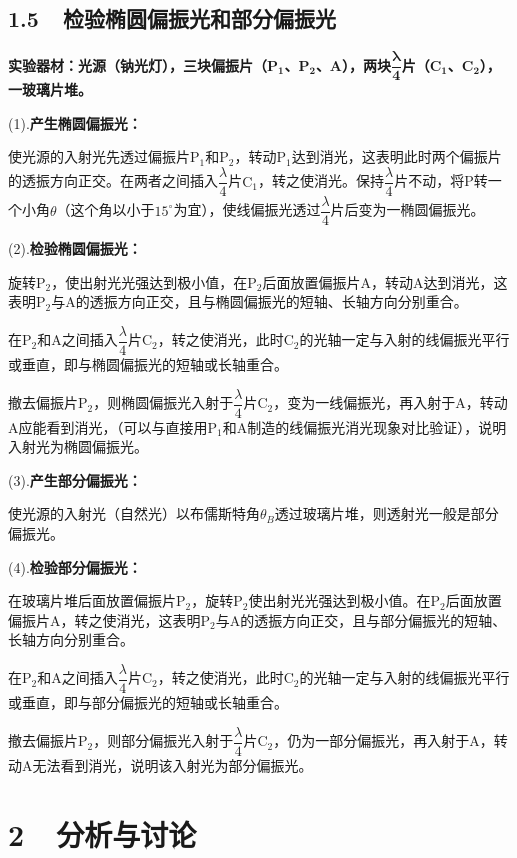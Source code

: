 \documentclass[a4paper,fontset=windows]{ctexart}
\begin{document}
{\newpage
\subsection*{1.5\ \ 检验椭圆偏振光和部分偏振光}

\textbf{实验器材：光源（钠光灯），三块偏振片（$\mathbf{P_1}$、$\mathbf{P_2}$、A），两块$\boldsymbol{\dfrac{\lambda}{4}}$片（$\mathbf{C_1}$、$\mathbf{C_2}$），一玻璃片堆。}

(1).\textbf{产生椭圆偏振光：}

使光源的入射光先透过偏振片$\mathrm{P_1}$和$\mathrm{P_2}$，转动$\mathrm{P_1}$达到消光，这表明此时两个偏振片的透振方向正交。在两者之间插入$\dfrac{\lambda}{4}$片$\mathrm{C_1}$，转之使消光。保持$\dfrac{\lambda}{4}$片不动，将P转一个小角$\theta$（这个角以小于$15^\circ$为宜），使线偏振光透过$\dfrac{\lambda}{4}$片后变为一椭圆偏振光。

(2).\textbf{检验椭圆偏振光：}

旋转$\mathrm{P_2}$，使出射光光强达到极小值，在$\mathrm{P_2}$后面放置偏振片A，转动A达到消光，这表明$\mathrm{P_2}$与A的透振方向正交，且与椭圆偏振光的短轴、长轴方向分别重合。

在$\mathrm{P_2}$和A之间插入$\dfrac{\lambda}{4}$片$\mathrm{C_2}$，转之使消光，此时$\mathrm{C_2}$的光轴一定与入射的线偏振光平行或垂直，即与椭圆偏振光的短轴或长轴重合。

撤去偏振片$\mathrm{P_2}$，则椭圆偏振光入射于$\dfrac{\lambda}{4}$片$\mathrm{C_2}$，变为一线偏振光，再入射于A，转动A应能看到消光，（可以与直接用$\mathrm{P_1}$和A制造的线偏振光消光现象对比验证），说明入射光为椭圆偏振光。

(3).\textbf{产生部分偏振光：}

使光源的入射光（自然光）以布儒斯特角$\theta_B$透过玻璃片堆，则透射光一般是部分偏振光。

(4).\textbf{检验部分偏振光：}

在玻璃片堆后面放置偏振片$\mathrm{P_2}$，旋转$\mathrm{P_2}$使出射光光强达到极小值。在$\mathrm{P_2}$后面放置偏振片A，转之使消光，这表明$\mathrm{P_2}$与A的透振方向正交，且与部分偏振光的短轴、长轴方向分别重合。

在$\mathrm{P_2}$和A之间插入$\dfrac{\lambda}{4}$片$\mathrm{C_2}$，转之使消光，此时$\mathrm{C_2}$的光轴一定与入射的线偏振光平行或垂直，即与部分偏振光的短轴或长轴重合。

撤去偏振片$\mathrm{P_2}$，则部分偏振光入射于$\dfrac{\lambda}{4}$片$\mathrm{C_2}$，仍为一部分偏振光，再入射于A，转动A无法看到消光，说明该入射光为部分偏振光。

\section*{2\ \  分析与讨论}

}
\end{document}
